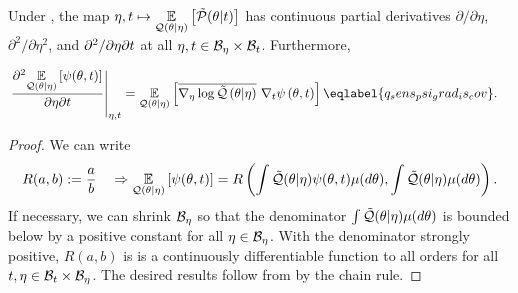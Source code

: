 



\begin{lem}

Under , the map $\eta, t \mapsto \underset{\mathcal{Q}(\theta
\vert \eta)}{\mathbb{E}}\left[\tilde{\mathcal{P}}(\theta \vert t)\right]$ has continuous partial derivatives
$\partial / \partial \eta$, $\partial^2 / \partial \eta^2$, and $\partial^2 /
\partial \eta \partial t$ at all $\eta, t \in \mathcal{B}_\eta \times \mathcal{B}_t$.
Furthermore,

\begin{align}
\fracat{\partial^2 \expect{\q(\theta \vert \eta)}
      {\psi(\theta, \t)}}{\partial \eta \partial \t}{\eta, \t}
={}&
\expect{\q(\theta \vert \eta)}
       {\lqgradbar{\theta \vert \eta} \psigrad{\theta,\t}}
\eqlabel{q_sens_psi_grad_is_cov}.
\end{align}

%
%
\begin{proof}
%
We can write
%
\begin{align*}
%
R(a, b) :={} \frac{a}{b} \quad \Rightarrow
\expect{\q(\theta \vert \eta)}{\psi(\theta, \t)} ={}
R\left(\int \qtil(\theta \vert \eta) \psi(\theta, \t) \mu(d\theta),
  \int \qtil(\theta \vert \eta) \mu(d\theta)\right).
%
\end{align*}
%
If necessary, we can shrink $\mathcal{B}_\eta$ so that the denominator $\int
\tilde{\mathcal{Q}}(\theta \vert \eta) \mu(d\theta)$ is bounded below by a positive constant
for all $\eta \in \mathcal{B}_\eta$.  With the denominator strongly positive, $R(a,b)$
is is a continuously differentiable function to all orders for all $t, \eta \in
\mathcal{B}_t \times \mathcal{B}_\eta$.  The desired results follow from
 by the chain rule.


\end{proof}
\end{lem}
